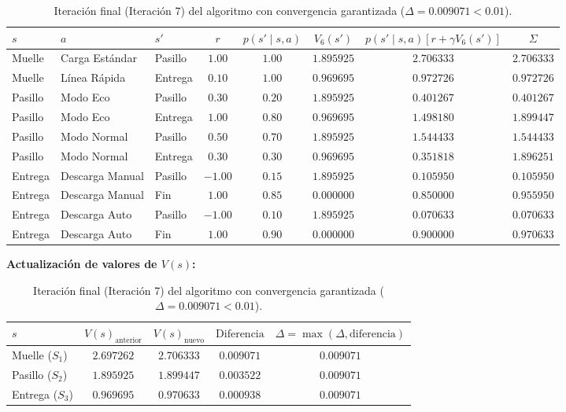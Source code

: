 \begin{table}[!htb]
\centering
\small
\setlength{\tabcolsep}{3.5pt}
\begin{tabular}{lllccccc}
\toprule
$s$ & $a$ & $s'$ & $r$ & $p(s' \mid s, a)$ & $V_6(s')$ & $p(s' \mid s, a)[r + \gamma V_6(s')]$ & $\Sigma$ \\
\midrule
Muelle & Carga Estándar & Pasillo & $1.00$ & $1.00$ & $1.895925$ & $2.706333$ & $\mathbf{2.706333}$ \\
Muelle & Línea Rápida   & Entrega & $0.10$ & $1.00$ & $0.969695$ & $0.972726$ & $0.972726$ \\
\midrule
Pasillo & Modo Eco    & Pasillo & $0.30$ & $0.20$ & $1.895925$ & $0.401267$ & $0.401267$ \\
Pasillo & Modo Eco    & Entrega & $1.00$ & $0.80$ & $0.969695$ & $1.498180$ & $\mathbf{1.899447}$ \\
Pasillo & Modo Normal & Pasillo & $0.50$ & $0.70$ & $1.895925$ & $1.544433$ & $1.544433$ \\
Pasillo & Modo Normal & Entrega & $0.30$ & $0.30$ & $0.969695$ & $0.351818$ & $1.896251$ \\
\midrule
Entrega & Descarga Manual & Pasillo & $-1.00$ & $0.15$ & $1.895925$ & $0.105950$ & $0.105950$ \\
Entrega & Descarga Manual & Fin     & $1.00$  & $0.85$ & $0.000000$ & $0.850000$ & $0.955950$ \\
Entrega & Descarga Auto   & Pasillo & $-1.00$ & $0.10$ & $1.895925$ & $0.070633$ & $0.070633$ \\
Entrega & Descarga Auto   & Fin     & $1.00$  & $0.90$ & $0.000000$ & $0.900000$ & $\mathbf{0.970633}$ \\
\bottomrule
\end{tabular}
\vspace{6pt}

\textbf{Actualización de valores de $V(s)$:}

\begin{tabular}{lcccc}
\toprule
$s$ & $V(s)_{\text{anterior}}$ & $V(s)_{\text{nuevo}}$ & $\text{Diferencia}$ & $\Delta = \max(\Delta, \text{diferencia})$ \\
\midrule
Muelle ($S_1$)  & $2.697262$ & $2.706333$ & $0.009071$ & $0.009071$ \\
Pasillo ($S_2$) & $1.895925$ & $1.899447$ & $0.003522$ & $0.009071$ \\
Entrega ($S_3$) & $0.969695$ & $0.970633$ & $0.000938$ & $0.009071$ \\
\bottomrule
\end{tabular}
\caption{Iteración final (Iteración 7) del algoritmo con convergencia garantizada ($\Delta = 0.009071 < 0.01$).}
\label{tab:iteracion_final}
\end{table}

